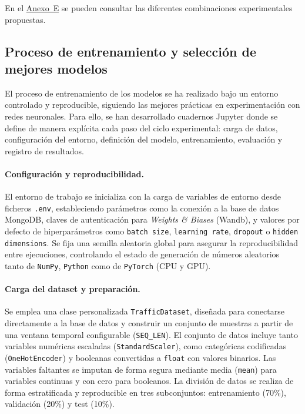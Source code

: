 En el \hyperref[anexo:combinaciones_exp]{Anexo~E} se pueden consultar las diferentes combinaciones experimentales propuestas.

\subsection{Proceso de entrenamiento y selección de mejores modelos}
\label{sec:entrenamiento_mej_modelos}

El proceso de entrenamiento de los modelos se ha realizado bajo un entorno controlado y reproducible, siguiendo las mejores prácticas en experimentación con redes neuronales. Para ello, se han desarrollado cuadernos Jupyter donde se define de manera explícita cada paso del ciclo experimental: carga de datos, configuración del entorno, definición del modelo, entrenamiento, evaluación y registro de resultados.

\paragraph{Configuración y reproducibilidad.}  
El entorno de trabajo se inicializa con la carga de variables de entorno desde ficheros \texttt{.env}, estableciendo parámetros como la conexión a la base de datos MongoDB, claves de autenticación para \textit{Weights \& Biases} (Wandb), y valores por defecto de hiperparámetros como \texttt{batch size}, \texttt{learning rate}, \texttt{dropout} o \texttt{hidden dimensions}. Se fija una semilla aleatoria global para asegurar la reproducibilidad entre ejecuciones, controlando el estado de generación de números aleatorios tanto de \texttt{NumPy}, \texttt{Python} como de \texttt{PyTorch} (CPU y GPU).

\paragraph{Carga del dataset y preparación.}  
Se emplea una clase personalizada \texttt{TrafficDataset}, diseñada para conectarse directamente a la base de datos y construir un conjunto de muestras a partir de una ventana temporal configurable (\texttt{SEQ\_LEN}). El conjunto de datos incluye tanto variables numéricas escaladas (\texttt{StandardScaler}), como categóricas codificadas (\texttt{OneHotEncoder}) y booleanas convertidas a \texttt{float} con valores binarios. Las variables faltantes se imputan de forma segura mediante media (\texttt{mean}) para variables continuas y con cero para booleanos. La división de datos se realiza de forma estratificada y reproducible en tres subconjuntos: entrenamiento (70\%), validación (20\%) y test (10\%).

